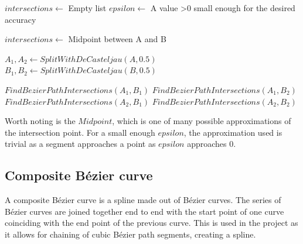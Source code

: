         \vspace{1cm}
        \begin{algorithmic}
            \State $intersections \gets$ Empty list
            \State $epsilon \gets$ A value >0 small enough for the desired accuracy
                    \State \Return
                \EndIf

                    \State $intersections \gets$ Midpoint between A and B
                    \State \Return
                \EndIf

                \State $A_1, A_2 \gets SplitWithDeCasteljau(A, 0.5)$
                \State $B_1, B_2 \gets SplitWithDeCasteljau(B, 0.5)$

                \State $FindBezierPathIntersections(A_1, B_1)$
                \State $FindBezierPathIntersections(A_1, B_2)$
                \State $FindBezierPathIntersections(A_2, B_1)$
                \State $FindBezierPathIntersections(A_2, B_2)$
            \EndProcedure
        \end{algorithmic}
        \vspace{1cm}

        Worth noting is the $Midpoint$, which is one of many possible approximations of the intersection point. For a small enough $epsilon$, the approximation used is trivial as a segment approaches a point as $epsilon$ approaches 0.

    \subsection{Composite Bézier curve}
        A composite Bézier curve is a spline made out of Bézier curves. The series of Bézier curves are joined together end to end with the start point of one curve coinciding with the end point of the previous curve. This is used in the project as it allows for chaining of cubic Bézier path segments, creating a spline.